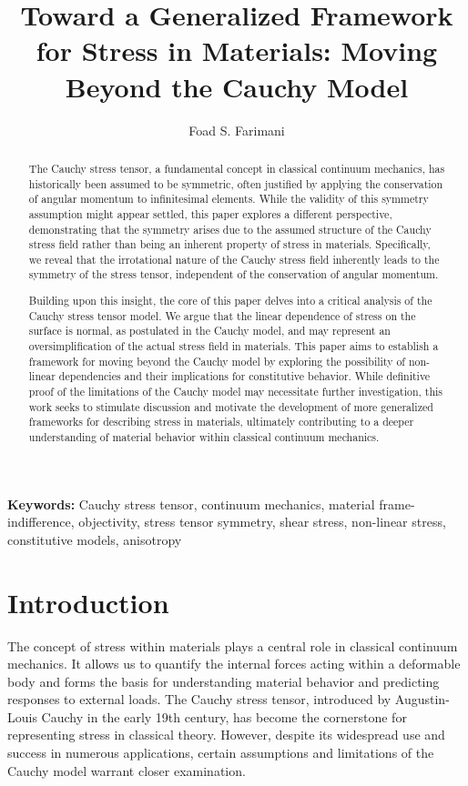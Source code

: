 \documentclass[12pt,a4paper,english]{article}
\title{Toward a Generalized Framework for Stress in Materials: Moving Beyond the Cauchy Model}
\author{Foad S. Farimani}
\date{} %
\begin{document}
\maketitle

\begin{abstract}
The Cauchy stress tensor, a fundamental concept in classical continuum mechanics, has historically been assumed to be symmetric, often justified by applying the conservation of angular momentum to infinitesimal elements. While the validity of this symmetry assumption might appear settled, this paper explores a different perspective, demonstrating that the symmetry arises due to the assumed structure of the Cauchy stress field rather than being an inherent property of stress in materials. Specifically, we reveal that the irrotational nature of the Cauchy stress field inherently leads to the symmetry of the stress tensor, independent of the conservation of angular momentum.

Building upon this insight, the core of this paper delves into a critical analysis of the Cauchy stress tensor model. We argue that the linear dependence of stress on the surface is normal, as postulated in the Cauchy model, and may represent an oversimplification of the actual stress field in materials. This paper aims to establish a framework for moving beyond the Cauchy model by exploring the possibility of non-linear dependencies and their implications for constitutive behavior. While definitive proof of the limitations of the Cauchy model may necessitate further investigation, this work seeks to stimulate discussion and motivate the development of more generalized frameworks for describing stress in materials, ultimately contributing to a deeper understanding of material behavior within classical continuum mechanics.
\end{abstract}

\textbf{Keywords:} Cauchy stress tensor, continuum mechanics, material frame-indifference, objectivity, stress tensor symmetry, shear stress, non-linear stress, constitutive models, anisotropy

\section{Introduction}

The concept of stress within materials plays a central role in classical continuum mechanics.  It allows us to quantify the internal forces acting within a deformable body and forms the basis for understanding material behavior and predicting responses to external loads. The Cauchy stress tensor, introduced by Augustin-Louis Cauchy in the early 19th century, has become the cornerstone for representing stress in classical theory. However, despite its widespread use and success in numerous applications, certain assumptions and limitations of the Cauchy model warrant closer examination. 
\end{document}
